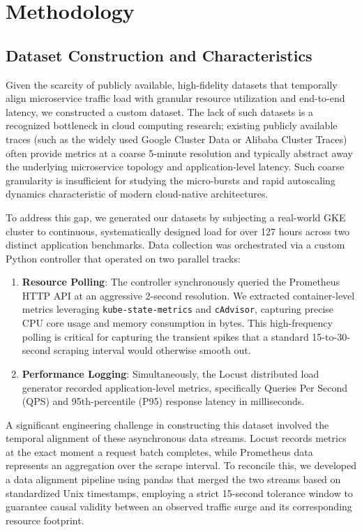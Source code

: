 \documentclass[conference]{IEEEtran}
\begin{document}
\section{Methodology}\label{sec:methodology}

\subsection{Dataset Construction and Characteristics}
Given the scarcity of publicly available, high-fidelity datasets that temporally align microservice traffic load with granular resource utilization and end-to-end latency, we constructed a custom dataset. The lack of such datasets is a recognized bottleneck in cloud computing research; existing publicly available traces (such as the widely used Google Cluster Data or Alibaba Cluster Traces) often provide metrics at a coarse 5-minute resolution and typically abstract away the underlying microservice topology and application-level latency. Such coarse granularity is insufficient for studying the micro-bursts and rapid autoscaling dynamics characteristic of modern cloud-native architectures.

To address this gap, we generated our datasets by subjecting a real-world GKE cluster to continuous, systematically designed load for over 127 hours across two distinct application benchmarks. Data collection was orchestrated via a custom Python controller that operated on two parallel tracks:
\begin{enumerate}
    \item \textbf{Resource Polling}: The controller synchronously queried the Prometheus HTTP API at an aggressive 2-second resolution. We extracted container-level metrics leveraging \texttt{kube-state-metrics} and \texttt{cAdvisor}, capturing precise CPU core usage and memory consumption in bytes. This high-frequency polling is critical for capturing the transient spikes that a standard 15-to-30-second scraping interval would otherwise smooth out.
    \item \textbf{Performance Logging}: Simultaneously, the Locust distributed load generator recorded application-level metrics, specifically Queries Per Second (QPS) and 95th-percentile (P95) response latency in milliseconds.
\end{enumerate}

A significant engineering challenge in constructing this dataset involved the temporal alignment of these asynchronous data streams. Locust records metrics at the exact moment a request batch completes, while Prometheus data represents an aggregation over the scrape interval. To reconcile this, we developed a data alignment pipeline using pandas that merged the two streams based on standardized Unix timestamps, employing a strict 15-second tolerance window to guarantee causal validity between an observed traffic surge and its corresponding resource footprint.
\end{document}
